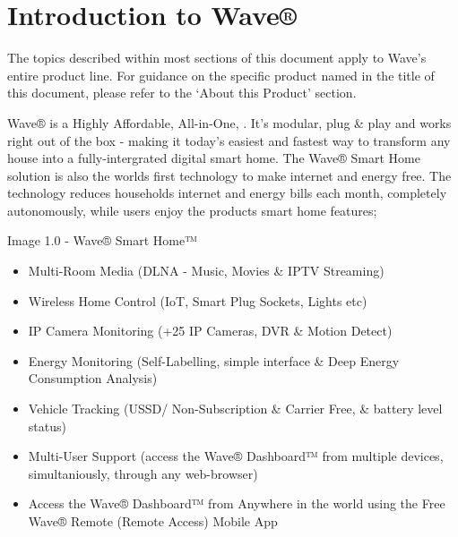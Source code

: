 \documentclass[letterpaper,10pt,english]{sphinxmanual}
\begin{document}
\chapter{Introduction to Wave®}
\label{\detokenize{introduction:introduction-to-wave}}\label{\detokenize{introduction::doc}}
The topics described within most sections of this document apply to Wave’s entire product line. For guidance on the specific product named in the title of this document, please refer to the ‘About this Product’ section.

Wave® is a Highly Affordable, All-in-One, . It’s modular, plug \& play and works right out of the box - making it today’s easiest and fastest way to transform any house into a fully-intergrated digital smart home. The Wave® Smart Home solution is also the worlds first technology to make internet and energy free. The technology reduces households internet and energy bills each month, completely autonomously, while users enjoy the products  smart home features;

Image 1.0 - Wave® Smart Home™

\noindent{}
\begin{itemize}
\item {} 
Multi-Room Media (DLNA - Music, Movies \& IPTV Streaming)

\item {} 
Wireless Home Control (IoT, Smart Plug Sockets, Lights etc)

\item {} 
IP Camera Monitoring (+25 IP Cameras, DVR \& Motion Detect)

\item {} 
Energy Monitoring (Self-Labelling, simple interface \& Deep Energy Consumption Analysis)

\item {} 
Vehicle Tracking (USSD/ Non-Subscription \& Carrier Free, \& battery level status)

\item {} 
Multi-User Support (access the Wave® Dashboard™ from multiple devices, simultaniously, through any web-browser)

\item {} 
Access the Wave® Dashboard™ from Anywhere in the world using the Free Wave® Remote (Remote Access) Mobile App

\end{itemize}
\end{document}
